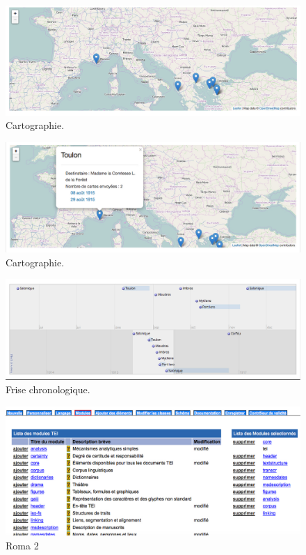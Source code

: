 \documentclass[12pt,a4paper]{book} %
\begin{document}
\begin{figure}[!h]
\centering
\begin{center}
\includegraphics[width=15cm]{4.JPG}
\end{center}
\caption{Cartographie.}
\end{figure}

\begin{figure}[!h]
\centering
\begin{center}
\includegraphics[width=15cm]{5.JPG}
\end{center}
\caption{Cartographie.}
\end{figure}


\begin{figure}[!h]
\centering
\begin{center}
\includegraphics[width=15cm]{3.JPG}
\end{center}
\caption{Frise chronologique.}
\end{figure}

\begin{figure}[!h]
\centering
\begin{center}
\includegraphics[width=16cm]{8.JPG}
\end{center}
\caption{Roma 2}
\end{figure}
\end{document}
